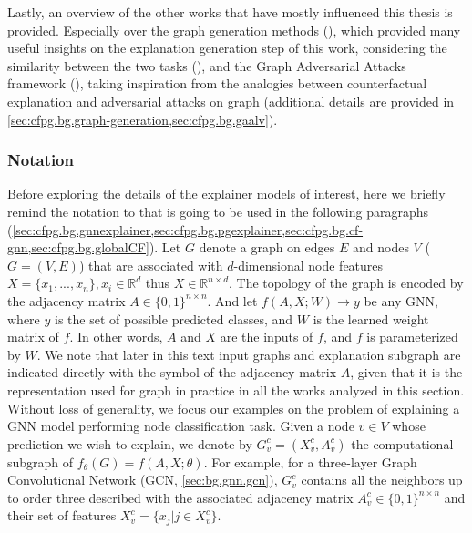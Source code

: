 \documentclass[binding=0.6cm]{sapthesis}
\newcommand{\mycite}[1]{(\cite{#1})}
\begin{document}
Lastly, an overview of the other works that have mostly influenced this thesis is provided. Especially over the graph generation methods \mycite{liu2019-cgvae,du2022-mdvae}, which provided many useful insights on the explanation generation step of this work, considering the similarity between the two tasks \mycite{zhu2022-survey-generation}, and the Graph Adversarial Attacks framework \mycite{bose2020-gaalvae}, taking inspiration from the analogies between counterfactual explanation and adversarial attacks on graph (additional details are provided in \cref{sec:cfpg.bg.graph-generation,sec:cfpg.bg.gaalv}). 


\subsubsection{Notation}
\label{sec:cfpg.bg.notation}
Before exploring the details of the explainer models of interest, here we briefly remind the notation to that is going to be used in the following paragraphs (\cref{sec:cfpg.bg.gnnexplainer,sec:cfpg.bg.pgexplainer,sec:cfpg.bg.cf-gnn,sec:cfpg.bg.globalCF}). Let $G$ denote a graph on edges $E$ and nodes $V$ ($G=(V,E)$) that are associated with $d$-dimensional node features $X = \{x_1 , . . . , x_n\}, x_i \in \mathbb{R}^d$ thus $X \in \mathbb{R}^{n\times d}$. The topology of the graph is encoded by the adjacency matrix $A \in \{0,1\}^{n\times n}$. And let $f(A, X; W ) \rightarrow y$ be any GNN, where $y$ is the set of possible predicted classes, and $W$ is the learned weight matrix of $f$. In other words, $A$ and $X$ are the inputs of $f$, and $f$ is parameterized by $W$. We note that later in this text input graphs and explanation subgraph are indicated directly with the symbol of the adjacency matrix $A$, given that it is the representation used for graph in practice in all the works analyzed in this section. 
Without loss of generality, we focus our examples on the problem of explaining a GNN model performing node classification task. Given a node $v \in V$ whose prediction we wish to explain, we denote by $G^c_v = (X^c_v, A^c_v)$ the computational subgraph of $f_{\theta}(G) = f(A, X; \theta)$. For example, for a three-layer Graph Convolutional Network (GCN, \cref{sec:bg.gnn.gcn}), $G^c_v$ contains all the neighbors up to order three described with the associated adjacency matrix $A^c_v \in \{0, 1\}^{n\times n}$ and their set of features $X^c_v = \{x_j | j \in X^c_v\}$.

\end{document}
